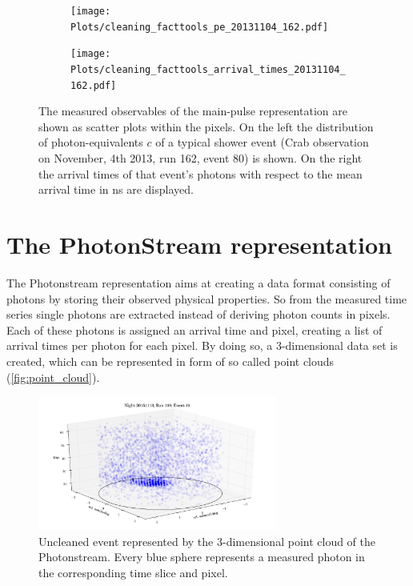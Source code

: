 \begin{figure}
  \begin{subfigure}{0.475\textwidth}
    \texttt{[image: Plots/cleaning\_facttools\_pe\_20131104\_162.pdf]}
  \end{subfigure}
  \begin{subfigure}{0.475\textwidth}
    \texttt{[image: Plots/cleaning\_facttools\_arrival\_times\_20131104\_162.pdf]}
  \end{subfigure}
  \caption{The measured observables of the main-pulse representation are shown as scatter plots within the pixels. On the left the distribution of photon-equivalents $c$ of a typical shower event (Crab observation on November, 4th 2013, run 162, event 80) is shown. On the right the arrival times of that event's photons with respect to the mean arrival time in ns are displayed.}
  \label{fig:mainpulse}
\end{figure}

\section{The PhotonStream representation}
\label{sec:phs}
%
The Photonstream representation aims at creating a data format consisting of photons by storing their observed physical properties. So from the measured time series single photons are extracted instead of deriving photon counts in pixels. Each of these photons is assigned an arrival time and pixel, creating a list of arrival times per photon for each pixel. By doing so, a 3-dimensional data set is created, which can be represented in form of so called point clouds (\autoref{fig:point_cloud}).
%
\begin{figure}
  \centering
  \includegraphics[width=0.7\textwidth]{Plots/event2.png}
  \caption{Uncleaned event represented by the 3-dimensional point cloud of the Photonstream. Every blue sphere represents a measured photon in the corresponding time slice and pixel.}
  \label{fig:point_cloud}
\end{figure}
%

